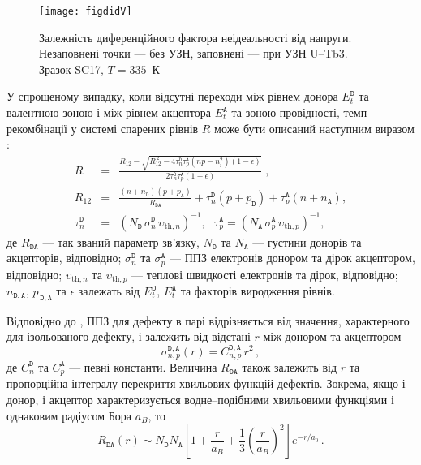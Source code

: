 \begin{figure}
\center
\texttt{[image: figdidV]}%
\caption{\label{figdidV}
Залежність диференційного фактора неідеальності від напруги.
Незаповнені точки --- без УЗН, заповнені --- при УЗН U--Tb3.
Зразок SC17, $T=335$~К
}%
\end{figure}

У спрощеному випадку, коли відсутні переходи між рівнем донора $E_t^{\mathtt{D}}$ та валентною зоною
і між рівнем акцептора $E_t^{\mathtt{A}}$ та зоною провідності,
темп рекомбінації у системі спарених рівнів $R$ може бути описаний наступним виразом \cite{CDLR:JAP1995}:
\begin{eqnarray}
R&=&\frac{R_{12}-\sqrt{R_{12}^{\,2}-4\tau_{n}^{\mathtt{D}}\tau_{p}^{\mathtt{A}}(np-n_i^2)(1-\epsilon)}}{2\tau_{n}^{\mathtt{D}}\tau_{p}^{\mathtt{A}}(1-\epsilon)}\;,\label{eqR}\\
R_{12}&=&\frac{(n+n_{\mathtt{D}})(p+p_{\mathtt{A}})}{R_{\mathtt{DA}}}+
\tau_{n}^{\mathtt{D}}(p+p_{\mathtt{D}})+\tau_{p}^{\mathtt{A}}(n+n_{\mathtt{A}}),\label{eqR12}\\
\tau_{n}^{\mathtt{D}}&=&(N_{\mathtt{D}}\,\sigma_{n}^{\mathtt{D}}\,\upsilon_{\mathrm{th},n})^{-1},\,\,\,\,
\tau_{p}^{\mathtt{A}}=(N_{\mathtt{A}}\,\sigma_{p}^{\mathtt{A}}\,\upsilon_{\mathrm{th},p})^{-1},\label{eqTAU}
\end{eqnarray}
де
$R_{\mathtt{DA}}$ --- так званий параметр зв'язку,
$N_{\mathtt{D}}$ та $N_{\mathtt{A}}$ --- густини донорів та акцепторів, відповідно;
$\sigma_{n}^{\mathtt{D}}$ та $\sigma_{p}^{\mathtt{A}}$ --- ППЗ електронів донором та дірок акцептором, відповідно;
$\upsilon_{\mathrm{th},n}$ та $\upsilon_{\mathrm{th},p}$ --- теплові швидкості електронів та дірок, відповідно;
$n_{\mathtt{D,A}}$, $p_{\,\mathtt{D,A}}$ та $\epsilon$ залежать від $E_t^{\mathtt{D}}$, $E_t^{\mathtt{A}}$ та факторів виродження рівнів.

Відповідно до \cite{CDLR:JAP},
ППЗ для дефекту в парі відрізняється від значення, характерного для ізольованого дефекту, і залежить від відстані $r$ між донором та акцептором
\begin{equation}
\label{eqSigma}
\sigma_{n,p}^{\mathtt{D,A}}(r)=C_{n,p}^{\mathtt{D,A}}\,r^2\,,
\end{equation}
де $C_{n}^{\mathtt{D}}$ та $C_{p}^{\mathtt{A}}$ --- певні константи.
Величина $R_{\mathtt{DA}}$ також залежить від $r$ та пропорційна інтегралу перекриття хвильових функцій дефектів.
Зокрема, якщо і донор, і акцептор характеризується водне--подібними хвильовими функціями і однаковим радіусом Бора $a_B$, то \cite{CDLR:JAP}
\begin{equation}
\label{eqRda}
R_{\mathtt{DA}} (r) \sim N_{\mathtt{D}}N_{\mathtt{A}}\left[1+\frac{r}{a_B}+\frac{1}{3}\left(\frac{r}{a_B}\right)^2\right]
   e^{-r/a_0}\,.
\end{equation}

